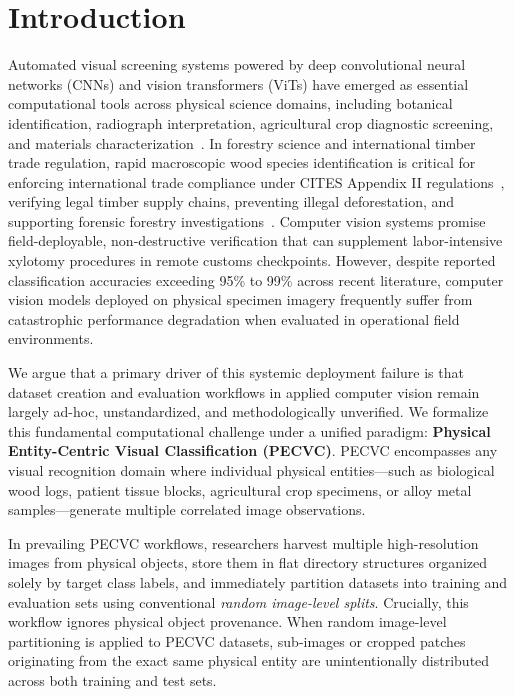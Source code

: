 \section{Introduction}

Automated visual screening systems powered by deep convolutional neural networks (CNNs) and vision transformers (ViTs) have emerged as essential computational tools across physical science domains, including botanical identification, radiograph interpretation, agricultural crop diagnostic screening, and materials characterization~\cite{woodreview,rosadasilva2022,varoquaux2022,roberts2021}. In forestry science and international timber trade regulation, rapid macroscopic wood species identification is critical for enforcing international trade compliance under CITES Appendix II regulations~\cite{cites}, verifying legal timber supply chains, preventing illegal deforestation, and supporting forensic forestry investigations~\cite{dormontt2015,song2025,liu2025}. Computer vision systems promise field-deployable, non-destructive verification that can supplement labor-intensive xylotomy procedures in remote customs checkpoints. However, despite reported classification accuracies exceeding 95\% to 99\% across recent literature, computer vision models deployed on physical specimen imagery frequently suffer from catastrophic performance degradation when evaluated in operational field environments.

We argue that a primary driver of this systemic deployment failure is that dataset creation and evaluation workflows in applied computer vision remain largely ad-hoc, unstandardized, and methodologically unverified. We formalize this fundamental computational challenge under a unified paradigm: \textbf{Physical Entity-Centric Visual Classification (PECVC)}. PECVC encompasses any visual recognition domain where individual physical entities---such as biological wood logs, patient tissue blocks, agricultural crop specimens, or alloy metal samples---generate multiple correlated image observations.

In prevailing PECVC workflows, researchers harvest multiple high-resolution images from physical objects, store them in flat directory structures organized solely by target class labels, and immediately partition datasets into training and evaluation sets using conventional \emph{random image-level splits}. Crucially, this workflow ignores physical object provenance. When random image-level partitioning is applied to PECVC datasets, sub-images or cropped patches originating from the exact same physical entity are unintentionally distributed across both training and test sets.

